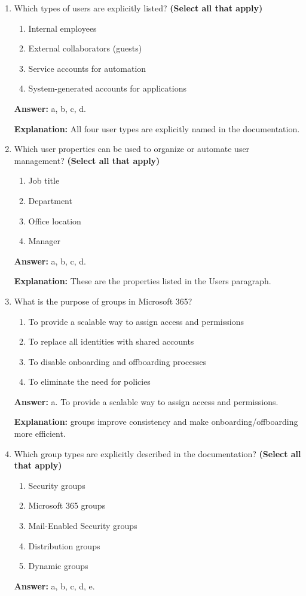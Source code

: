\documentclass[10pt]{article}
\begin{document}
\begin{enumerate}[leftmargin=*]
\textbf{Explanation:} a user in Microsoft Entra ID represents an individual identity.

\item Which types of users are explicitly listed? \textbf{(Select all that apply)}
\begin{enumerate}[label=\alph*., leftmargin=1.5em]
\item Internal employees
\item External collaborators (guests)
\item Service accounts for automation
\item System-generated accounts for applications
\end{enumerate}
\textbf{Answer:} a, b, c, d.

\textbf{Explanation:} All four user types are explicitly named in the documentation.

\item Which user properties can be used to organize or automate user management? \textbf{(Select all that apply)}
\begin{enumerate}[label=\alph*., leftmargin=1.5em]
\item Job title
\item Department
\item Office location
\item Manager
\end{enumerate}
\textbf{Answer:} a, b, c, d.

\textbf{Explanation:} These are the properties listed in the Users paragraph.

\item What is the purpose of groups in Microsoft 365?
\begin{enumerate}[label=\alph*., leftmargin=1.5em]
\item To provide a scalable way to assign access and permissions
\item To replace all identities with shared accounts
\item To disable onboarding and offboarding processes
\item To eliminate the need for policies
\end{enumerate}
\textbf{Answer:} a. To provide a scalable way to assign access and permissions.

\textbf{Explanation:} groups improve consistency and make onboarding/offboarding more efficient.

\item Which group types are explicitly described in the documentation? \textbf{(Select all that apply)}
\begin{enumerate}[label=\alph*., leftmargin=1.5em]
\item Security groups
\item Microsoft 365 groups
\item Mail-Enabled Security groups
\item Distribution groups
\item Dynamic groups
\end{enumerate}
\textbf{Answer:} a, b, c, d, e.


\end{enumerate}
\end{document}

